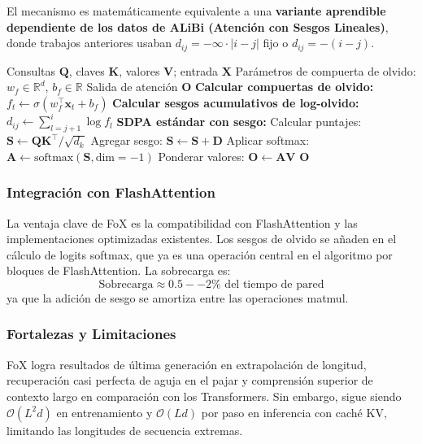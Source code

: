 \documentclass[11pt,a4paper]{article}
\begin{document}
El mecanismo es matemáticamente equivalente a una \textbf{variante aprendible dependiente de los datos de ALiBi (Atención con Sesgos Lineales)}, donde trabajos anteriores usaban $d_{ij} = -\infty \cdot |i-j|$ fijo o $d_{ij} = -(i-j)$.

\begin{algorithm}[H]
\caption{FoX: Atención con Olvido y Sesgo de Actualidad}
\begin{algorithmic}[1]
\Require Consultas $\mathbf{Q}$, claves $\mathbf{K}$, valores $\mathbf{V}$; entrada $\mathbf{X}$
\Require Parámetros de compuerta de olvido: $w_f \in \mathbb{R}^d$, $b_f \in \mathbb{R}$
\Ensure Salida de atención $\mathbf{O}$
\State \textbf{Calcular compuertas de olvido:}
    \State $f_t \gets \sigma(w_f^\top \mathbf{x}_t + b_f)$ 
\EndFor
\State \textbf{Calcular sesgos acumulativos de log-olvido:}
        \State $d_{ij} \gets \sum_{l=j+1}^{i} \log f_l$ 
    \EndFor
\EndFor
\State \textbf{SDPA estándar con sesgo:}
\State Calcular puntajes: $\mathbf{S} \gets \mathbf{Q}\mathbf{K}^\top / \sqrt{d_k}$
\State Agregar sesgo: $\mathbf{S} \gets \mathbf{S} + \mathbf{D}$
\State Aplicar softmax: $\mathbf{A} \gets \text{softmax}(\mathbf{S}, \text{dim}=-1)$
\State Ponderar valores: $\mathbf{O} \gets \mathbf{A} \mathbf{V}$
\Return $\mathbf{O}$
\end{algorithmic}
\end{algorithm}

\subsubsection{Integración con FlashAttention}

La ventaja clave de FoX es la compatibilidad con FlashAttention y las implementaciones optimizadas existentes. Los sesgos de olvido se añaden en el cálculo de logits softmax, que ya es una operación central en el algoritmo por bloques de FlashAttention. La sobrecarga es:
\[
\text{Sobrecarga} \approx 0.5--2\% \text{ del tiempo de pared}
\]
ya que la adición de sesgo se amortiza entre las operaciones matmul.

\subsubsection{Fortalezas y Limitaciones}

FoX logra resultados de última generación en extrapolación de longitud, recuperación casi perfecta de aguja en el pajar y comprensión superior de contexto largo en comparación con los Transformers. Sin embargo, sigue siendo $\mathcal{O}(L^2 d)$ en entrenamiento y $\mathcal{O}(L d)$ por paso en inferencia con caché KV, limitando las longitudes de secuencia extremas.
\end{document}
